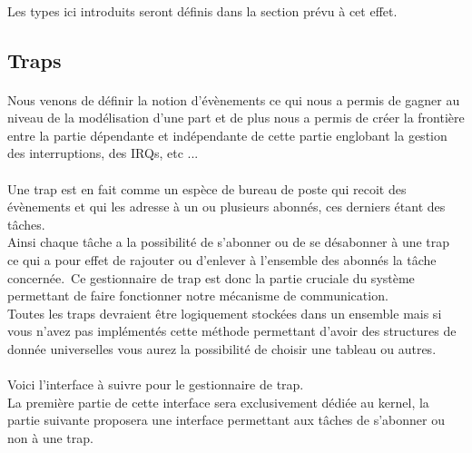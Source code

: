 \documentclass[10pt,a4wide]{article}
\begin{document}
\paragraph{}

Les types ici introduits seront d\'efinis dans la section pr\'evu \`a cet effet.

\subsection{Traps}

\paragraph{}

Nous venons de d\'efinir la notion d'\'ev\`enements ce qui nous a permis de gagner au niveau de la mod\'elisation d'une part
et de plus nous a permis de cr\'eer la fronti\`ere entre la partie d\'ependante et ind\'ependante de cette partie
englobant la gestion des interruptions, des IRQs, etc ...

\paragraph{}

Une trap est en fait comme un esp\`ece de bureau de poste qui recoit des \'ev\`enements et qui les adresse \`a un ou
plusieurs abonn\'es, ces derniers \'etant des t\^aches.\\
Ainsi chaque t\^ache a la possibilit\'e de s'abonner ou de se d\'esabonner \`a une trap ce qui a pour effet de
rajouter ou d'enlever \`a l'ensemble des abonn\'es la t\^ache concern\'ee.\
Ce gestionnaire de trap est donc la partie cruciale du syst\`eme permettant de faire fonctionner notre
m\'ecanisme de communication.\\
Toutes les traps devraient \^etre logiquement stock\'ees dans un ensemble mais si vous n'avez pas impl\'ement\'es cette m\'ethode
permettant d'avoir des structures de donn\'ee universelles vous aurez la possibilit\'e de choisir une tableau ou autres.

\paragraph{}

Voici l'interface \`a suivre pour le gestionnaire de trap.\\
La premi\`ere partie de cette interface sera exclusivement d\'edi\'ee au kernel, la partie suivante
proposera une interface permettant aux t\^aches de s'abonner ou non \`a une trap.
\end{document}
